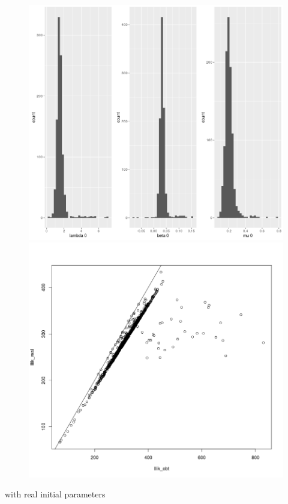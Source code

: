 \documentclass[]{article}
\begin{document}
 \begin{figure}[h]
\centering
\includegraphics[width=.5\textwidth]{mu01v3.png}
\includegraphics[width=.5\textwidth]{llikv3.png}
\end{figure}

\newpage

with real initial parameters 
\end{document}
